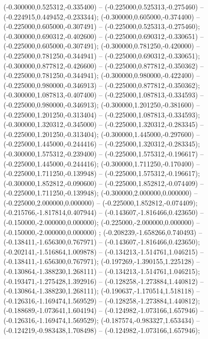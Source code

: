  (-0.300000,0.525312,-0.335400) -- (-0.225000,0.525313,-0.275460) -- (-0.224915,0.449452,-0.233344);
 (-0.300000,0.605000,-0.374400) -- (-0.225000,0.605000,-0.307491) -- (-0.225000,0.525313,-0.275460);
 (-0.300000,0.690312,-0.402600) -- (-0.225000,0.690312,-0.330651) -- (-0.225000,0.605000,-0.307491);
 (-0.300000,0.781250,-0.420000) -- (-0.225000,0.781250,-0.344941) -- (-0.225000,0.690312,-0.330651);
 (-0.300000,0.877812,-0.426600) -- (-0.225000,0.877812,-0.350362) -- (-0.225000,0.781250,-0.344941);
 (-0.300000,0.980000,-0.422400) -- (-0.225000,0.980000,-0.346913) -- (-0.225000,0.877812,-0.350362);
 (-0.300000,1.087813,-0.407400) -- (-0.225000,1.087813,-0.334593) -- (-0.225000,0.980000,-0.346913);
 (-0.300000,1.201250,-0.381600) -- (-0.225000,1.201250,-0.313404) -- (-0.225000,1.087813,-0.334593);
 (-0.300000,1.320312,-0.345000) -- (-0.225000,1.320312,-0.283345) -- (-0.225000,1.201250,-0.313404);
 (-0.300000,1.445000,-0.297600) -- (-0.225000,1.445000,-0.244416) -- (-0.225000,1.320312,-0.283345);
 (-0.300000,1.575312,-0.239400) -- (-0.225000,1.575312,-0.196617) -- (-0.225000,1.445000,-0.244416);
 (-0.300000,1.711250,-0.170400) -- (-0.225000,1.711250,-0.139948) -- (-0.225000,1.575312,-0.196617);
 (-0.300000,1.852812,-0.090600) -- (-0.225000,1.852812,-0.074409) -- (-0.225000,1.711250,-0.139948);
 (-0.300000,2.000000,0.000000) -- (-0.225000,2.000000,0.000000) -- (-0.225000,1.852812,-0.074409);
 (-0.215766,-1.817814,0.407944) -- (-0.143607,-1.816466,0.423650) -- (-0.150000,-2.000000,0.000000);
 (-0.225000,-2.000000,0.000000) -- (-0.150000,-2.000000,0.000000) ;
 (-0.208239,-1.658266,0.740493) -- (-0.138411,-1.656300,0.767971) -- (-0.143607,-1.816466,0.423650);
 (-0.202141,-1.516864,1.009878) -- (-0.134213,-1.514761,1.046215) -- (-0.138411,-1.656300,0.767971);
 (-0.197269,-1.390155,1.225128) -- (-0.130864,-1.388230,1.268111) -- (-0.134213,-1.514761,1.046215);
 (-0.193471,-1.275428,1.392916) -- (-0.128258,-1.273884,1.440812) -- (-0.130864,-1.388230,1.268111);
 (-0.190637,-1.170514,1.518118) -- (-0.126316,-1.169474,1.569529) -- (-0.128258,-1.273884,1.440812);
 (-0.188689,-1.073641,1.604194) -- (-0.124982,-1.073166,1.657946) -- (-0.126316,-1.169474,1.569529);
 (-0.187574,-0.983327,1.653434) -- (-0.124219,-0.983438,1.708498) -- (-0.124982,-1.073166,1.657946);
